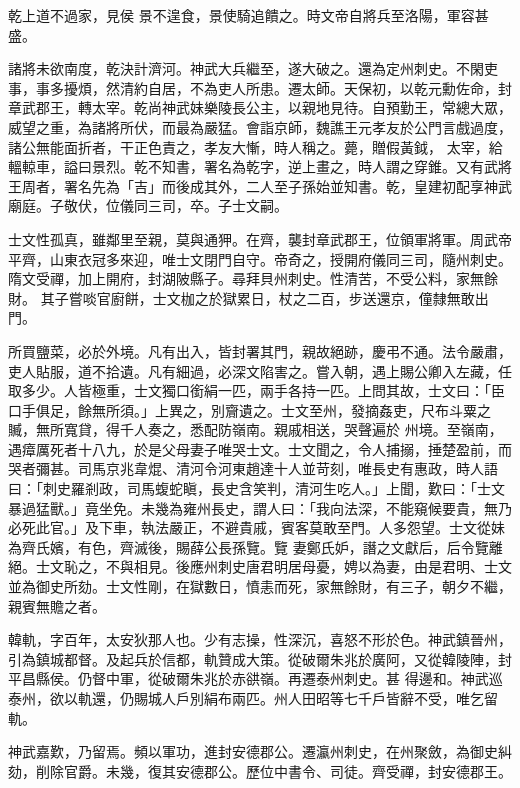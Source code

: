 \begin{pinyinscope}
 乾上道不過家，見侯
 景不遑食，景使騎追饋之。時文帝自將兵至洛陽，軍容甚盛。



 諸將未欲南度，乾決計濟河。神武大兵繼至，遂大破之。還為定州刺史。不閑吏事，事多擾煩，然清約自居，不為吏人所患。遷太師。天保初，以乾元勳佐命，封章武郡王，轉太宰。乾尚神武妹樂陵長公主，以親地見待。自預勤王，常總大眾，威望之重，為諸將所伏，而最為嚴猛。會詣京師，魏譙王元孝友於公門言戲過度，諸公無能面折者，干正色責之，孝友大慚，時人稱之。薨，贈假黃鉞，
 太宰，給轀輬車，謚曰景烈。乾不知書，署名為乾字，逆上畫之，時人謂之穿錐。又有武將王周者，署名先為「吉」而後成其外，二人至子孫始並知書。乾，皇建初配享神武廟庭。子敬伏，位儀同三司，卒。子士文嗣。



 士文性孤真，雖鄰里至親，莫與通狎。在齊，襲封章武郡王，位領軍將軍。周武帝平齊，山東衣冠多來迎，唯士文閉門自守。帝奇之，授開府儀同三司，隨州刺史。隋文受禪，加上開府，封湖陂縣子。尋拜貝州刺史。性清苦，不受公料，家無餘財。
 其子嘗啖官廚餅，士文枷之於獄累日，杖之二百，步送還京，僮隸無敢出門。



 所買鹽菜，必於外境。凡有出入，皆封署其門，親故絕跡，慶弔不通。法令嚴肅，吏人貼服，道不拾遺。凡有細過，必深文陷害之。嘗入朝，遇上賜公卿入左藏，任取多少。人皆極重，士文獨口銜絹一匹，兩手各持一匹。上問其故，士文曰：「臣口手俱足，餘無所須。」上異之，別齎遺之。士文至州，發摘姦吏，尺布斗粟之贓，無所寬貸，得千人奏之，悉配防嶺南。親戚相送，哭聲遍於
 州境。至嶺南，遇瘴厲死者十八九，於是父母妻子唯哭士文。士文聞之，令人捕搦，捶楚盈前，而哭者彌甚。司馬京兆韋焜、清河令河東趙達十人並苛刻，唯長史有惠政，時人語曰：「刺史羅剎政，司馬蝮蛇瞋，長史含笑判，清河生吃人。」上聞，歎曰：「士文暴過猛獸。」竟坐免。未幾為雍州長史，謂人曰：「我向法深，不能窺候要貴，無乃必死此官。」及下車，執法嚴正，不避貴戚，賓客莫敢至門。人多怨望。士文從妹為齊氏嬪，有色，齊滅後，賜薛公長孫覽。覽
 妻鄭氏妒，譖之文獻后，后令覽離絕。士文恥之，不與相見。後應州刺史唐君明居母憂，娉以為妻，由是君明、士文並為御史所劾。士文性剛，在獄數日，憤恚而死，家無餘財，有三子，朝夕不繼，親賓無贍之者。



 韓軌，字百年，太安狄那人也。少有志操，性深沉，喜怒不形於色。神武鎮晉州，引為鎮城都督。及起兵於信都，軌贊成大策。從破爾朱兆於廣阿，又從韓陵陣，封平昌縣侯。仍督中軍，從破爾朱兆於赤谼嶺。再遷泰州刺史。甚
 得邊和。神武巡泰州，欲以軌還，仍賜城人戶別絹布兩匹。州人田昭等七千戶皆辭不受，唯乞留軌。



 神武嘉歎，乃留焉。頻以軍功，進封安德郡公。遷瀛州刺史，在州聚斂，為御史糾劾，削除官爵。未幾，復其安德郡公。歷位中書令、司徒。齊受禪，封安德郡王。




\end{pinyinscope}
